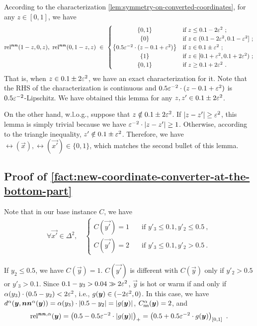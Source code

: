 According to the characterization \cref{lem:symmetry-on-converted-coordinates}, for any $z\in [0,1]$, we have
\begin{align*}
    \rel(1-z,0,z),~\rel(0,1-z,z) ~\in~
    \begin{cases}
        \hfill \{0,1\} \hfill & \text{if $z\leq 0.1-2\eps^2$~;} \\
        \hfill \settxt{0} \hfill & \text{if $z\in (0.1-2\eps^2, 0.1-\eps^2]$~;} \\
        \hfill \set{0.5\eps^{-2}\cdot(z-0.1+\eps^2)} \hfill & \text{if $z\in 0.1\pm \eps^2$~;} \\
        \hfill \settxt{1} \hfill & \text{if $z\in [0.1+\eps^2, 0.1+2\eps^2)$~;} \\
        \hfill \{0,1\} \hfill & \text{if $z\geq 0.1+2\eps^2$~.}
    \end{cases}
\end{align*}
That is, when $z\in 0.1\pm 2\eps^2$, we have an exact characterization for it.
Note that the RHS of the characterization is continuous and $0.5\eps^{-2}\cdot (z-0.1+\eps^2)$ is $0.5\eps^{-2}$-Lipschitz. 
We have obtained this lemma for any $z,z'\in 0.1\pm 2\eps^{2}$.

On the other hand, w.l.o.g., suppose that $z\notin 0.1 \pm 2\eps^{2}$.
If $|z-z'|\geq \eps^2$, this lemma is simply trivial because we have $\eps^{-2}\cdot |z-z'|\geq 1$. 
Otherwise, according to the triangle inequality, $z'\notin 0.1\pm \eps^2$. 
Therefore, we have $\rel(\vec{x}), \rel(\vec{x'}) \in \{0,1\}$, which matches the second bullet of this lemma.

\subsection{Proof of \cref{fact:new-coordinate-converter-at-the-bottom-part}}
\label{proof:new-coordinate-converter-at-the-bottom-part}

\repiii*

Note that in our base instance $C$, we have 
\begin{align*}
    \forall \vec{x'}\in \Delta^2, \quad
    \begin{cases}
    C(\vec{y'}) = 1 & \quad \text{if } y'_3\leq 0.1, y'_2 \leq 0.5~,\\
    C(\vec{y'}) = 2 & \quad \text{if } y'_3\leq 0.1, y'_2 > 0.5~.
    \end{cases}
\end{align*}

If $y_2\leq 0.5$, we have $C(\vec{y})=1$. 
$C(\vec{y'})$ is different with $C(\vec{y})$ only if $y'_2>0.5$ or $y'_3>0.1$. 
Since $0.1-y_3>0.04\gg 2\eps^2$, $\vec{y}$ is hot or warm if and only if $\alpha(y_3) \cdot (0.5-y_2)<2\eps^2$, i.e., $g(\vec{y})\in (-2\eps^2,0)$. 
In this case, we have $d^{\alpha}(\vec{y}, \nna(\vec{y})) = \alpha(y_3)\cdot |0.5-y_2| = |g(\vec{y})|$, $C^{\alpha}_{\sf nn}(\vec{y})=2$, and 
\begin{align*}
    \rela(\vec{y}) = \left(0.5-0.5\eps^{-2}\cdot |g(\vec{y})|\right)_+ = \left(0.5+0.5\eps^{-2}\cdot g(\vec{y})\right)_{[0,1]}~.
\end{align*}

